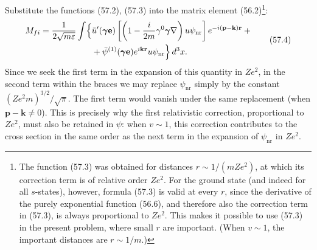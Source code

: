 Substitute the functions (57.2), (57.3) into the matrix element (56.2)\footnote{The function (57.3) was obtained for distances $r\sim1/(mZe^2)$, at which its correction term is of relative order $Ze^2$. For the ground state (and indeed for all $s$-states), however, formula (57.3) is valid at every $r$, since the derivative of the purely exponential function (56.6), and therefore also the correction term in (57.3), is always proportional to $Ze^2$. This makes it possible to use (57.3) in the present problem, where small $r$ are important. (When $v\sim1$, the important distances are $r\sim1/m$.)}:
\begin{equation}
\begin{aligned}
M_{fi}=\frac1{2\sqrt{m\varepsilon}}\int
\Bigl\{&
\bar u'(\boldsymbol\gamma\mathbf e)
\left[\left(1-\frac i{2m}\gamma^0\boldsymbol\gamma\nabla\right)
u\psi_{\text{nr}}\right]e^{-i(\mathbf p-\mathbf k)\mathbf r}+{}\\
&+\bar\psi^{(1)}(\boldsymbol\gamma\mathbf e)
e^{i\mathbf k\mathbf r}u\psi_{\text{nr}}\Bigr\}\,d^3x.
\end{aligned}
\tag{57.4}
\end{equation}
Since we seek the first term in the expansion of this quantity in $Ze^2$, in the second term within the braces we may replace $\psi_{\text{nr}}$ simply by the constant $(Ze^2m)^{3/2}/\sqrt\pi$. The first term would vanish under the same replacement (when $\mathbf p-\mathbf k\ne0$). This is precisely why the first relativistic correction, proportional to $Ze^2$, must also be retained in $\psi$: when $v\sim1$, this correction contributes to the cross section in the same order as the next term in the expansion of $\psi_{\text{nr}}$ in $Ze^2$.

